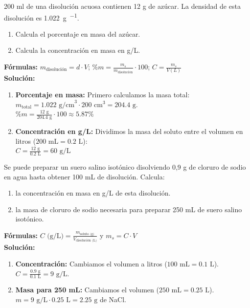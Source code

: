 \begin{exercise}
    200 ml de una disolución acuosa contienen 12 g de azúcar. La densidad de esta disolución es \qty{1.022}{\g\per\cmcubicos}.
    \begin{enumerate}[label=\letraminuscula]
        \item Calcula el porcentaje en masa del azúcar.
        \item Calcula la concentración en masa en g/L.
    \end{enumerate}
    \begin{solu}
        \textbf{Fórmulas:} $m_{\text{disolución}} = d \cdot V$; $\%m = \frac{m_s}{m_{\text{disolución}}} \cdot 100$; $C = \frac{m_s}{V(L)}$ \\
        \textbf{Solución:}
        \begin{enumerate}[label=\alph*)]
        \item \textbf{Porcentaje en masa:}
        Primero calculamos la masa total: $m_{\text{total}} = 1.022 \text{ g/cm}^3 \cdot 200 \text{ cm}^3 = 204.4 \text{ g}$. \\
        $\%m = \frac{12 \text{ g}}{204.4 \text{ g}} \cdot 100 \approx 5.87\%$
        \item \textbf{Concentración en g/L:}
        Dividimos la masa del soluto entre el volumen en litros ($200 \text{ mL} = 0.2 \text{ L}$): \\
        $C = \frac{12 \text{ g}}{0.2 \text{ L}} = 60 \text{ g/L}$
        \end{enumerate}
    \end{solu}
\end{exercise}

\begin{exercise}
    Se puede preparar un suero salino isotónico disolviendo 0,9 g de cloruro de sodio en agua hasta obtener 100 mL de disolución.
    Calcula:
    \begin{enumerate}[label=\letraminuscula]
            \item la concentración en masa en g/L de esta disolución.
            \item la masa de cloruro de sodio necesaria para preparar 250 mL de suero salino isotónico.
    \end{enumerate}
    \begin{solu}
        \textbf{Fórmulas:} $C \text{ (g/L)} = \frac{m_{\text{soluto (g)}}}{V_{\text{disolución (L)}}}$ y $m_s = C \cdot V$ \\
        \textbf{Solución:}
        \begin{enumerate}[label=\alph*)]
                \item \textbf{Concentración:} Cambiamos el volumen a litros ($100 \text{ mL} = 0.1 \text{ L}$). \\
                $C = \frac{0.9 \text{ g}}{0.1 \text{ L}} = 9 \text{ g/L}$.
                \item \textbf{Masa para 250 mL:} Cambiamos el volumen ($250 \text{ mL} = 0.25 \text{ L}$). \\
                $m = 9 \text{ g/L} \cdot 0.25 \text{ L} = 2.25 \text{ g}$ de NaCl.
        \end{enumerate}
    \end{solu}
\end{exercise}


